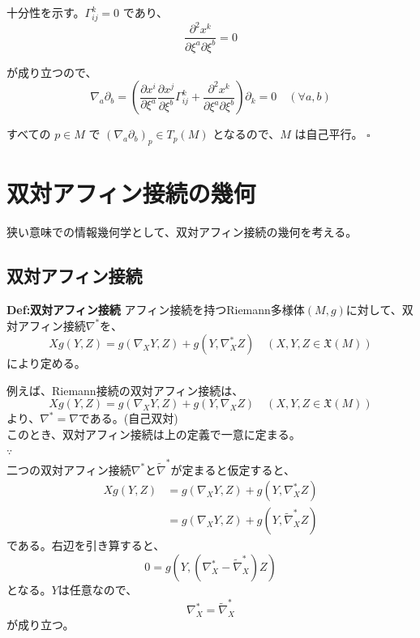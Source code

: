 \documentclass[a4paper,11pt]{jsarticle}
\numberwithin{equation}{section}
\begin{document}
十分性を示す。\(\Gamma_{ij}^k = 0\) であり、
\begin{equation}
\frac{\partial^2 x^k}{\partial \xi^a \partial \xi^b} = 0 
\end{equation}

が成り立つので、
\begin{equation}
\nabla_a \partial_b = \left( \frac{\partial x^i}{\partial \xi^a} \frac{\partial x^j}{\partial \xi^b} \Gamma_{ij}^k + \frac{\partial^2 x^k}{\partial \xi^a \partial \xi^b} \right) \partial_k = 0 \quad (\forall a, b) 
\end{equation}

すべての \(p \in M\) で \((\nabla_a \partial_b)_p \in T_p(M)\) となるので、\(M\) は自己平行。 \(\square\)

\newpage

\section{双対アフィン接続の幾何}
狭い意味での情報幾何学として、双対アフィン接続の幾何を考える。\\
\subsection{双対アフィン接続}
\begin{itembox}[l]{\textbf{Def:双対アフィン接続}}
    アフィン接続を持つRiemann多様体$(M,g)$に対して、双対アフィン接続$\nabla ^*$を、
    \begin{equation}
        Xg(Y,Z) = g(\nabla_X Y,Z) + g(Y,\nabla^*_X Z) \quad (X,Y,Z \in \mathfrak{X}(M))
    \end{equation}
    により定める。
\end{itembox}
例えば、Riemann接続の双対アフィン接続は、
\begin{equation}
    Xg(Y, Z) = g(\nabla_X Y, Z) + g(Y, \nabla_X Z) \quad (X, Y, Z \in \mathfrak{X}(M))
\end{equation}
より、$\nabla^* = \nabla$である。(自己双対)\\

このとき、双対アフィン接続は上の定義で一意に定まる。\\
$\because$\\
二つの双対アフィン接続$\nabla^*$と$\tilde{\nabla}^*$が定まると仮定すると、
\begin{align}
    Xg(Y,Z) &= g(\nabla_X Y,Z) + g(Y,\nabla^*_X Z) \\
    &= g(\nabla_X Y,Z) + g(Y,\tilde{\nabla}^*_X Z)
\end{align}
である。右辺を引き算すると、
\begin{equation}
    0 = g(Y,(\nabla^*_X - \tilde{\nabla}^*_X)Z)
\end{equation}
となる。$Y$は任意なので、
\begin{equation}
    \nabla^*_X = \tilde{\nabla}^*_X
\end{equation}
が成り立つ。\hfill\qedsymbol
\end{document}
